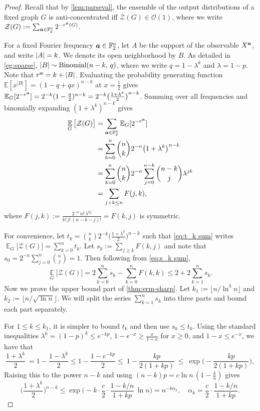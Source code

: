 \documentclass{article}
\theoremstyle{plain}
\theoremstyle{definition}
\theoremstyle{remark}
\begin{document}
\begin{proof}
Recall that by \cref{lem:parseval}, the ensemble of the output distributions of a fixed graph $G$ is anti-concentrated iff $\mathcal Z(G)\in\mathcal O(1)$, where we write $\mathcal Z(G):=\sum_{{\bm{a}}\in\mathbb F_2^n}2^{-r^{\bm{a}}(G)}$. 

For a fixed Fourier frequency ${\bm{a}} \in \mathbb{F}_2^n$, let $A$ be the support of the observable $X^{\bm{a}}$, and write $\abs{A}=k$. We denote its open neighborhood by $B$. As detailed in \cref{eg:sparse}, $\abs{B} \sim \mathrm{Binomial}(n-k,\,q)$, where we write $q = 1-\lambda^{k}$ and $\lambda=1-p$. Note that $r^{\bm{a}} = k + \abs{B}$. Evaluating the probability generating function $\mathbb E[x^{|B|}]=(1-q+qx)^{n-k}$ at $x=\frac12$ gives $\mathbb{E}_G[2^{-r^{\bm{a}}}]=2^{-k}(1-\frac q2)^{n-k}=2^{-k}\big(\frac{1+\lambda^k}{2}\big)^{n-k}$. Summing over all frequencies and binomially expanding $(1+\lambda^k)^{n-k}$ gives
\begin{align}\label{eq:erm-exact}
\operatorname*{\mathbb{E}}_G\big[\mathcal Z(G)\big]
&= \sum_{{\bm{a}}\in\mathbb F_2^n} \mathbb{E}_G[2^{-r^{\bm{a}}}] \\
&=\sum_{k=0}^n \binom nk2^{-n} \big(1+\lambda^k\big)^{n-k} \label{eq:t_k sum}\\
&= \sum_{k=0}^n \binom nk2^{-n} \sum_{j=0}^{n-k} \binom {n-k}j \lambda^{jk} \\
&=\sum_{j+k\le n}F(j,k), \label{eq:s_k sum}
\end{align}
where $F(j,k):=\frac{2^{-n}\,n!\,\lambda^{kj}}{k!\,j!\,(n-k-j)!}=F(k,j)$ is symmetric. 

For convenience, let $t_k=\binom nk2^{-k}\big(\frac{1+\lambda^k}{2}\big)^{n-k}$ such that \eqref{eq:t_k sum} writes $\operatorname*{\mathbb{E}}_G\big[\mathcal Z(G)\big] = \sum\limits_{k=0}^n t_k$. Let $s_k:=\sum_{j\ge k}F(k,j)$ and note that $s_0=2^{-n}\sum\limits_{j=0}^n\binom nj=1$. Then following from \eqref{eq:s_k sum}, 
\begin{equation}\label{eq:erm-upper}
\operatorname*{\mathbb{E}}_G\big[\mathcal Z(G)\big]=2\sum_{k=0}^{n} s_k-\sum_{k=0}^{n}F(k,k)\le2+2\sum_{k=1}^{n}s_k .
\end{equation}
Now we prove the upper bound part of \cref{thm:erm-sharp}. Let $k_1:=\lfloor n/\ln^3n\rfloor$ and $k_2:=\lfloor n/\sqrt{\ln n}\rfloor$. We will split the series $\sum\limits_{k=1}^{n} s_k$ into three parts and bound each part separately. 

\medskip
\noindent
For $1\leq k \leq k_1$, it is simpler to bound $t_k$ and then use $s_k\leq t_k$. Using the standard inequalities $\lambda^k=(1-p)^k\le e^{-kp}$, $1-e^{-x}\ge\frac{x}{1+x}$ for $x\ge0$, and $1-x\le e^{-x}$, we have that
\begin{equation}
\frac{1+\lambda^k}{2}\ = 1- \frac{1-\lambda^k}{2} \le 1- \frac{1-e^{-kp}}{2} \le\ 1-\frac{kp}{2(1+kp)}\ \le\ \exp\Big(-\frac{kp}{2(1+kp)}\Big),
\end{equation}
Raising this to the power $n-k$ and using $(n-k)p=c\ln n\,(1-\frac kn)$ gives
\begin{equation}
\Big(\frac{1+\lambda^k}{2}\Big)^{n-k} \leq
\exp\Big(-k\cdot\frac c2\cdot\frac{1-k/n}{1+kp}\,\ln n\Big)=n^{-k\alpha_k}, \quad \alpha_k=\frac c2\cdot\frac{1-k/n}{1+kp}.
\end{equation}


\end{proof}
\end{document}
